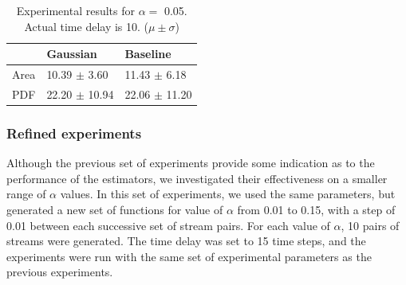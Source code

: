 \documentclass[a4paper,11pt]{article}
\begin{document}
\begin{table}[htb]

\begin{center}
\begin{tabular}{l|ll}
       &  Gaussian           &  Baseline           \\
\hline
 Area  &  10.39 $\pm$ 3.60   &  11.43 $\pm$ 6.18   \\
 PDF   &  22.20 $\pm$ 10.94  &  22.06 $\pm$ 11.20  \\
\end{tabular}
\end{center}
\caption{Experimental results for $\alpha=$ 0.05. Actual time delay is 10. ($\mu\pm\sigma$)} \label{fig:pretab}\end{table}
\subsubsection{Refined experiments}
\label{sec-8-1-2}

Although the previous set of experiments provide some indication as to the
performance of the estimators, we investigated their effectiveness on a smaller
range of $\alpha$ values. In this set of experiments, we used the same
parameters, but generated a new set of functions for value of $\alpha$ from
0.01 to 0.15, with a step of 0.01 between each successive set of stream
pairs. For each value of $\alpha$, 10 pairs of streams were generated. The time
delay was set to 15 time steps, and the experiments were run with the same set
of experimental parameters as the previous experiments.
\end{document}
